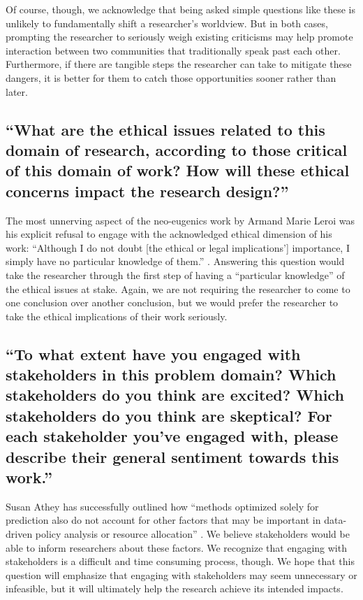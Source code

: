 \documentclass[12pt]{article}
\begin{document}
		Of course, though, we acknowledge that being asked simple questions like these is unlikely to fundamentally shift a researcher's worldview. But in both cases, prompting the researcher to seriously weigh existing criticisms may help promote interaction between two communities that traditionally speak past each other. Furthermore, if there are tangible steps the researcher can take to mitigate these dangers, it is better for them to catch those opportunities sooner rather than later. 

	\subsection{``What are the ethical issues related to this domain of research, according to those critical of this domain of work? How will these ethical concerns impact the research design?''}
	
		The most unnerving aspect of the neo-eugenics work by Armand Marie Leroi was his explicit refusal to engage with the acknowledged ethical dimension of his work: ``Although I do not doubt [the ethical or legal implications'] importance, I simply have no particular knowledge of them.'' \cite{neoeugenics}. Answering this question would take the researcher through the first step of having a ``particular knowledge'' of the ethical issues at stake. Again, we are not requiring the researcher to come to one conclusion over another conclusion, but we would prefer the researcher to take the ethical implications of their work seriously. 

	\subsection{``To what extent have you engaged with stakeholders in this problem domain? Which stakeholders do you think are excited? Which stakeholders do you think are skeptical? For each stakeholder you've engaged with, please describe their general sentiment towards this work.''}
	
		Susan Athey has successfully outlined how ``methods optimized solely for prediction also do not account for other factors that may be important in data-driven policy analysis or resource allocation'' \cite{beyondprediction}. We believe stakeholders would be able to inform researchers about these factors. We recognize that engaging with stakeholders is a difficult and time consuming process, though. We hope that this question will emphasize that engaging with stakeholders may seem unnecessary or infeasible, but it will ultimately help the research achieve its intended impacts. 
\end{document}
